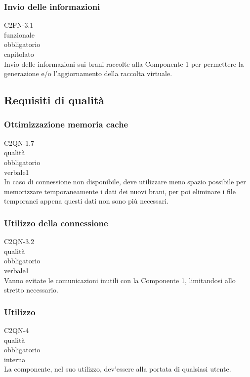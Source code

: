 \subsubsection*{Invio delle informazioni}
 C2FN-3.1 \\
 funzionale \\
 obbligatorio \\
 capitolato \\
Invio delle informazioni sui brani raccolte alla Componente 1 per permettere la
generazione e/o l'aggiornamento della raccolta virtuale.

\subsection{Requisiti di qualit\`a}
\subsubsection*{Ottimizzazione memoria cache}
 C2QN-1.7 \\
 qualit\`a \\
 obbligatorio \\
 verbale1 \\
In caso di connessione non disponibile, deve utilizzare meno spazio possibile
per memorizzare temporaneamente i dati dei nuovi brani, per poi eliminare i file
temporanei appena questi dati non sono pi\`u necessari.

\subsubsection*{Utilizzo della connessione}
 C2QN-3.2 \\
 qualit\`a \\
 obbligatorio \\
 verbale1 \\
Vanno evitate le comunicazioni inutili con la Componente 1, limitandosi allo
stretto necessario.

\subsubsection*{Utilizzo}
 C2QN-4\\
 qualit\`a \\
 obbligatorio \\
 interna \\
La componente, nel suo utilizzo, dev'essere alla portata di qualsiasi utente.

